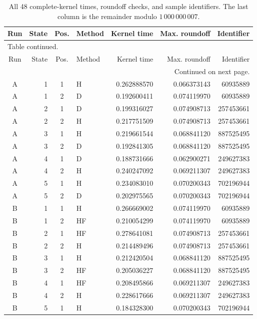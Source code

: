 \documentclass[11pt,a4paper]{article}
\theoremstyle{definition}
\begin{document}
\begingroup\small
\setlength{\tabcolsep}{5pt}
\begin{longtable}{@{}c r c l r r r@{}}
\caption{All 48 complete-kernel times, roundoff checks, and sample
identifiers. The last column is the remainder modulo $1\,000\,000\,007$.}\\
\toprule
Run & State & Pos. & Method & Kernel time & Max. roundoff & Identifier\\
\midrule\endfirsthead
\multicolumn{7}{l}{\small Table continued.}\\
\toprule
Run & State & Pos. & Method & Kernel time & Max. roundoff & Identifier\\
\midrule\endhead
\midrule\multicolumn{7}{r}{\small Continued on next page.}\\\endfoot
\bottomrule\endlastfoot
A & 1 & 1 & H & 0.262888570 & 0.066373143 & 60935889 \\
A & 1 & 2 & D & 0.192600411 & 0.074119970 & 60935889 \\
A & 2 & 1 & D & 0.199316027 & 0.074908713 & 257453661 \\
A & 2 & 2 & H & 0.217751509 & 0.074908713 & 257453661 \\
A & 3 & 1 & H & 0.219661544 & 0.068841120 & 887525495 \\
A & 3 & 2 & D & 0.192841305 & 0.068841120 & 887525495 \\
A & 4 & 1 & D & 0.188731666 & 0.062900271 & 249627383 \\
A & 4 & 2 & H & 0.240247092 & 0.069211307 & 249627383 \\
A & 5 & 1 & H & 0.234083010 & 0.070200343 & 702196944 \\
A & 5 & 2 & D & 0.202975565 & 0.070200343 & 702196944 \\
\addlinespace
B & 1 & 1 & H & 0.266669002 & 0.074119970 & 60935889 \\
B & 1 & 2 & HF & 0.210054299 & 0.074119970 & 60935889 \\
B & 2 & 1 & HF & 0.278641081 & 0.074908713 & 257453661 \\
B & 2 & 2 & H & 0.214489496 & 0.074908713 & 257453661 \\
B & 3 & 1 & H & 0.212420504 & 0.068841120 & 887525495 \\
B & 3 & 2 & HF & 0.205036227 & 0.068841120 & 887525495 \\
B & 4 & 1 & HF & 0.208495866 & 0.069211307 & 249627383 \\
B & 4 & 2 & H & 0.228617666 & 0.069211307 & 249627383 \\
B & 5 & 1 & H & 0.184328300 & 0.070200343 & 702196944 \\

\end{longtable}
\end{document}
